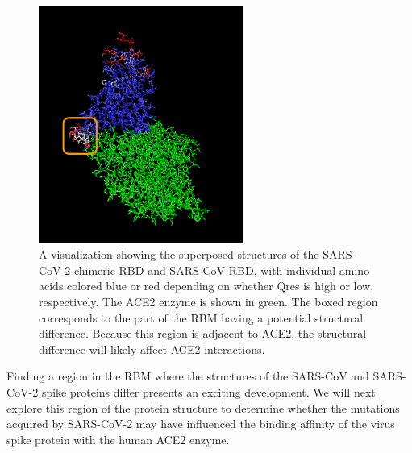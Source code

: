 \begin{figure}[h]
	\centering
	\mySfFamily
	\includegraphics[width = 0.6\textwidth]{../images/QresVMD.png}
	\caption{A visualization showing the superposed structures of the SARS-CoV-2 chimeric RBD  and SARS-CoV RBD, with individual amino acids colored blue or red depending on whether Qres is high or low, respectively.  The ACE2 enzyme is shown in green. The boxed region corresponds to the part of the RBM having a potential structural difference. Because this region is adjacent to ACE2, the structural difference will likely affect ACE2 interactions.}
	\label{fig:QresVMD}
\end{figure}

\begin{note}\end{note}

Finding a region in the RBM where the structures of the SARS-CoV and SARS-CoV-2 spike proteins differ presents an exciting development. We will next explore this region of the protein structure to determine whether the mutations acquired by SARS-CoV-2 may have influenced the binding affinity of the virus spike protein with the human ACE2 enzyme.\\

